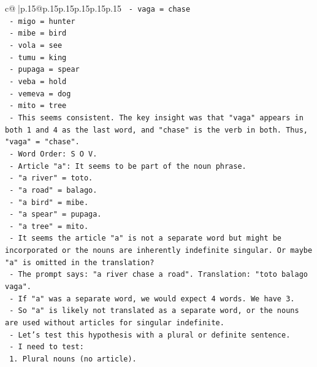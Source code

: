 \documentclass{article}
\begin{document}
{\begin{supertabular}{c@{$\;$}|p{.15\linewidth}@{}p{.15\linewidth}p{.15\linewidth}p{.15\linewidth}p{.15\linewidth}p{.15\linewidth}}
{{{\texttt{                  {-} vaga = chase} \\
\texttt{                  {-} migo = hunter} \\
\texttt{                  {-} mibe = bird} \\
\texttt{                  {-} vola = see} \\
\texttt{                  {-} tumu = king} \\
\texttt{                  {-} pupaga = spear} \\
\texttt{                  {-} veba = hold} \\
\texttt{                  {-} vemeva = dog} \\
\texttt{                  {-} mito = tree} \\
\texttt{              {-} This seems consistent. The key insight was that "vaga" appears in both 1 and 4 as the last word, and "chase" is the verb in both. Thus, "vaga" = "chase".} \\
\texttt{              {-} Word Order: S O V.} \\
\texttt{              {-} Article "a": It seems to be part of the noun phrase.} \\
\texttt{                {-} "a river" = toto.} \\
\texttt{                {-} "a road" = balago.} \\
\texttt{                {-} "a bird" = mibe.} \\
\texttt{                {-} "a spear" = pupaga.} \\
\texttt{                {-} "a tree" = mito.} \\
\texttt{                {-} It seems the article "a" is not a separate word but might be incorporated or the nouns are inherently indefinite singular. Or maybe "a" is omitted in the translation?} \\
\texttt{                {-} The prompt says: "a river chase a road". Translation: "toto balago vaga".} \\
\texttt{                {-} If "a" was a separate word, we would expect 4 words. We have 3.} \\
\texttt{                {-} So "a" is likely not translated as a separate word, or the nouns are used without articles for singular indefinite.} \\
\texttt{                {-} Let's test this hypothesis with a plural or definite sentence.} \\
\texttt{                {-} I need to test:} \\
\texttt{                  1. Plural nouns (no article).} \\
}}}
\end{supertabular}}
\end{document}
